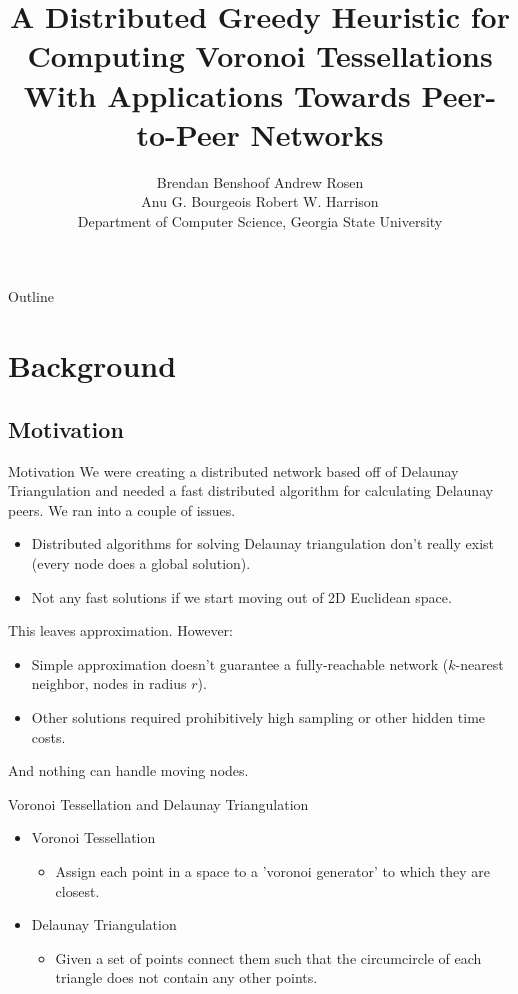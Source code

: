 \documentclass[8pt]{beamer}
\title{A Distributed Greedy Heuristic for Computing Voronoi Tessellations With Applications Towards Peer-to-Peer Networks}
\author{Brendan Benshoof \qquad Andrew Rosen \qquad \\Anu G. Bourgeois \qquad Robert W. Harrison \\Department of Computer Science, Georgia State University}
\begin{document}
	\maketitle
	
	
	
\begin{frame}{Outline}
	\tableofcontents
\end{frame}
	
	
\section{Background}
\subsection{Motivation}
	
	\begin{frame}{Motivation}
		We were creating a distributed network based off of Delaunay Triangulation and needed a fast distributed algorithm for calculating Delaunay peers.
		We ran into a couple of issues.
		\begin{itemize}
			\item Distributed algorithms for solving Delaunay triangulation don't really exist (every node does a global solution).
			\item Not any fast solutions if we start moving out of 2D Euclidean space.
		\end{itemize}
		This leaves approximation.  However:
		\begin{itemize}
			\item Simple approximation doesn't guarantee a fully-reachable network ($k$-nearest neighbor, nodes in radius $r$).
			\item Other solutions \cite{voronet} required prohibitively high sampling or other hidden time costs.
		\end{itemize}
		And nothing can handle moving nodes.
	\end{frame}		
	
	\begin{frame}{Voronoi Tessellation and Delaunay Triangulation}
		\begin{itemize}
			\item Voronoi Tessellation
				\begin{itemize}
					\item Assign each point in a space to a 'voronoi generator' to which they are closest.
				\end{itemize}
			\item Delaunay Triangulation
			\begin{itemize}
				\item Given a set of points connect them such that the circumcircle of each triangle does not contain any other points.
			\end{itemize}
		\end{itemize}
	\end{frame}
			
\end{document}
